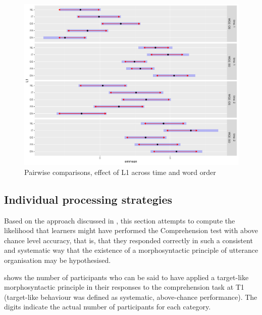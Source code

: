 \begin{figure}[p]
    \includegraphics[height=.4\textheight]{figures/05-4.pdf}
    \caption{Pairwise comparisons, effect of L1 across time and word order}
    \label{fig:05:4}
\end{figure}
\clearpage

\subsection{Individual processing strategies}\label{sec:05:2.3}

Based on the approach discussed in , this section attempts to compute the likelihood that learners might have performed the Comprehension test with above chance level accuracy, that is, that they responded correctly in such a consistent and systematic way that the existence of a morphosyntactic principle of utterance organisation may be hypothesised.

 shows the number of participants who can be said to have applied a target-like morphosyntactic principle in their responses to the comprehension task at T1 (target-like behaviour was defined as systematic, above-chance performance). The digits indicate the actual number of participants for each category.

